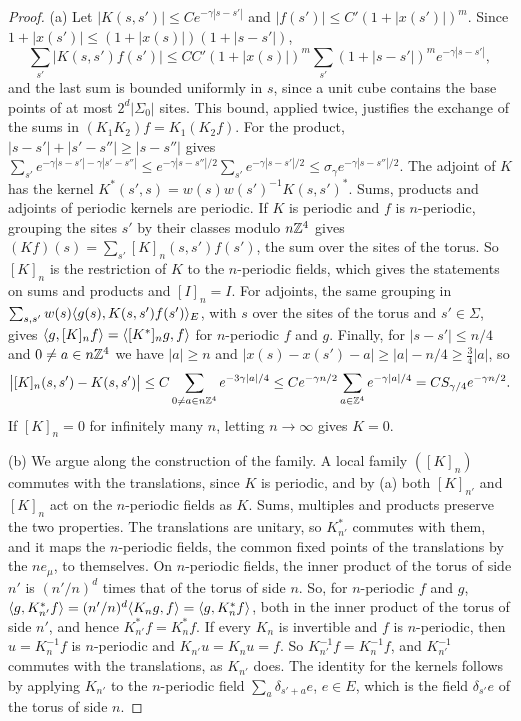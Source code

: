 \begin{lemma}
\begin{enumerate}[label=(\alph*)]
\end{enumerate}
\end{lemma}

\begin{proof}
(a) Let $|K(s,s')|\le Ce^{-\gamma|s-s'|}$ and $|f(s')|\le C'(1+|x(s')|)^m$. Since $1+|x(s')|\le(1+|x(s)|)(1+|s-s'|)$,
\[
\sum_{s'}|K(s,s')f(s')|\le CC'(1+|x(s)|)^m\sum_{s'}(1+|s-s'|)^me^{-\gamma|s-s'|},
\]
and the last sum is bounded uniformly in $s$, since a unit cube contains the base points of at most $2^d|\Sigma_0|$ sites. This bound, applied twice, justifies the exchange of the sums in $(K_1K_2)f=K_1(K_2f)$. For the product, $|s-s'|+|s'-s''|\ge|s-s''|$ gives $\sum_{s'}e^{-\gamma|s-s'|-\gamma|s'-s''|}\le e^{-\gamma|s-s''|/2}\sum_{s'}e^{-\gamma|s-s'|/2}\le\sigma_\gamma e^{-\gamma|s-s''|/2}$. The adjoint of $K$ has the kernel $K^*(s',s)=w(s)w(s')^{-1}K(s,s')^*$. Sums, products and adjoints of periodic kernels are periodic. If $K$ is periodic and $f$ is $n$-periodic, grouping the sites $s'$ by their classes modulo $n\mathbb Z^4$ gives $(Kf)(s)=\sum_{s'}[K]_n(s,s')f(s')$, the sum over the sites of the torus. So $[K]_n$ is the restriction of $K$ to the $n$-periodic fields, which gives the statements on sums and products and $[I]_n=I$. For adjoints, the same grouping in $\sum_{s,s'}w(s)\langle g(s),K(s,s')f(s')\rangle_E$, with $s$ over the sites of the torus and $s'\in\Sigma$, gives $\langle g,[K]_nf\rangle=\langle [K^*]_ng,f\rangle$ for $n$-periodic $f$ and $g$. Finally, for $|s-s'|\le n/4$ and $0\ne a\in n\mathbb Z^4$ we have $|a|\ge n$ and $|x(s)-x(s')-a|\ge|a|-n/4\ge\frac34|a|$, so
\[
\big|[K]_n(s,s')-K(s,s')\big|\le C\sum_{0\ne a\in n\mathbb Z^4}e^{-3\gamma|a|/4}\le Ce^{-\gamma n/2}\sum_{a\in\mathbb Z^4}e^{-\gamma|a|/4}=CS_{\gamma/4}e^{-\gamma n/2} .
\]
If $[K]_n=0$ for infinitely many $n$, letting $n\to\infty$ gives $K=0$.

(b) We argue along the construction of the family. A local family $([K]_n)$ commutes with the translations, since $K$ is periodic, and by (a) both $[K]_{n'}$ and $[K]_n$ act on the $n$-periodic fields as $K$. Sums, multiples and products preserve the two properties. The translations are unitary, so $K_{n'}^*$ commutes with them, and it maps the $n$-periodic fields, the common fixed points of the translations by the $ne_\mu$, to themselves. On $n$-periodic fields, the inner product of the torus of side $n'$ is $(n'/n)^d$ times that of the torus of side $n$. So, for $n$-periodic $f$ and $g$, $\langle g,K_{n'}^*f\rangle=(n'/n)^d\langle K_ng,f\rangle=\langle g,K_n^*f\rangle$, both in the inner product of the torus of side $n'$, and hence $K_{n'}^*f=K_n^*f$. If every $K_n$ is invertible and $f$ is $n$-periodic, then $u=K_n^{-1}f$ is $n$-periodic and $K_{n'}u=K_nu=f$. So $K_{n'}^{-1}f=K_n^{-1}f$, and $K_{n'}^{-1}$ commutes with the translations, as $K_{n'}$ does. The identity for the kernels follows by applying $K_{n'}$ to the $n$-periodic field $\sum_a\delta_{s'+a}e$, $e\in E$, which is the field $\delta_{s'}e$ of the torus of side $n$.


\end{proof}
